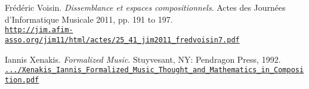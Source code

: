 \begin{thebibliography}{99}
	Fr\'{e}d\'{e}ric Voisin. \textit{Dissemblance et espaces compositionnels}. Actes des Journ\'{e}es d'Informatique Musicale 2011, pp. 191 to 197.\\ 
	\href{http://jim.afim-asso.org/jim11/html/actes/25\_41\_jim2011\_fredvoisin7.pdf}{\scriptsize{\texttt{http://jim.afim-asso.org/jim11/html/actes/25\_41\_jim2011\_fredvoisin7.pdf}}} \normalsize{}

	Iannis Xenakis. \textit{Formalized Music}. Stuyvesant, NY: Pendragon Press, 1992.\\ 
	\href{https://monoskop.org/images/7/74/Xenakis\_Iannis\_Formalized\_Music\_Thought\_and\_Mathematics\_in\_Composition.pdf}{\scriptsize{\texttt{.../Xenakis\_Iannis\_Formalized\_Music\_Thought\_and\_Mathematics\_in\_Composition.pdf}}} \normalsize{}

\end{thebibliography}